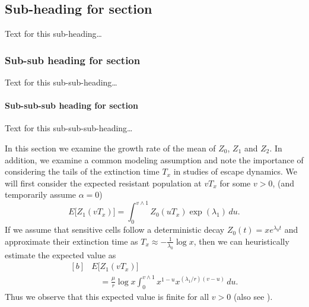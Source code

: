 \documentclass{bmcart}\usepackage[]{graphicx}\usepackage[]{color}
\begin{document}
\subsection*{Sub-heading for section}
Text for this sub-heading\ldots
\subsubsection*{Sub-sub heading for section}
Text for this sub-sub-heading\ldots
\paragraph*{Sub-sub-sub heading for section}
Text for this sub-sub-sub-heading\ldots

In this section we examine the growth rate of the mean of $Z_0$, $Z_1$ and $Z_2$. In
addition, we examine a common modeling assumption and note the
importance of considering the tails of the extinction time $T_x$ in
studies of escape dynamics.
We will first consider the expected resistant population at $vT_x$ for
some $v>0$, (and temporarily assume $\alpha=0$)
%
\[
E \bigl[Z_1(vT_x) \bigr]=
\int_0^{v\wedge
1}Z_0(uT_x)
\exp (\lambda_1)\,du .
\]
%
If we assume that sensitive cells follow a deterministic decay
$Z_0(t)=xe^{\lambda_0 t}$ and approximate their extinction time as
$T_x\approx-\frac{1}{\lambda_0}\log x$, then we can heuristically
estimate the expected value as
%
\begin{equation}\label{eqexpmuts}
\begin{aligned}[b]
&      E\bigl[Z_1(vT_x)\bigr]\\
&\quad      = \frac{\mu}{r}\log x
\int_0^{v\wedge1}x^{1-u}x^{({\lambda_1}/{r})(v-u)}\,du .
\end{aligned}
\end{equation}
%
Thus we observe that this expected value is finite for all $v>0$ (also see \cite{koon,xjon,marg,schn,koha,issnic}).
\end{document}
